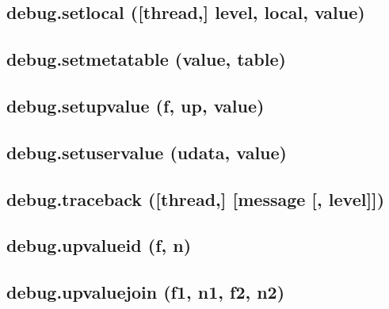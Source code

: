 \documentclass[12pt]{article}
\begin{document}
\subsection{debug.setlocal ([thread,] level, local, value)}

\subsection{debug.setmetatable (value, table)}

\subsection{debug.setupvalue (f, up, value)}

\subsection{debug.setuservalue (udata, value)}

\subsection{debug.traceback ([thread,] [message [, level]])}

\subsection{debug.upvalueid (f, n)}

\subsection{debug.upvaluejoin (f1, n1, f2, n2)}
\end{document}

